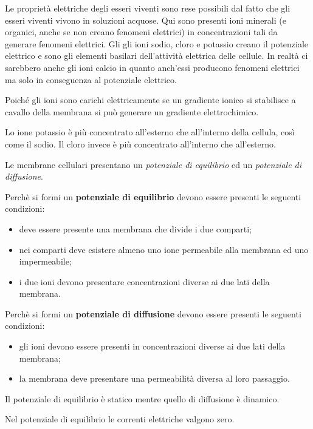 \documentclass[]{article}
\begin{document}
Le proprietà elettriche degli esseri viventi sono rese possibili dal
fatto che gli esseri viventi vivono in soluzioni acquose. Qui sono
presenti ioni minerali (e organici, anche se non creano fenomeni
elettrici) in concentrazioni tali da generare fenomeni elettrici. Gli
gli ioni sodio, cloro e potassio creano il potenziale elettrico e sono
gli elementi basilari dell'attività elettrica delle cellule. In realtà
ci sarebbero anche gli ioni calcio in quanto anch'essi producono
fenomeni elettrici ma solo in conseguenza al potenziale elettrico.

Poiché gli ioni sono carichi elettricamente se un gradiente ionico si
stabilisce a cavallo della membrana si può generare un gradiente
elettrochimico.

Lo ione potassio è più concentrato all'esterno che all'interno della
cellula, così come il sodio. Il cloro invece è più concentrato
all'interno che all'esterno.

Le membrane cellulari presentano un \emph{potenziale di equilibrio} ed
un \emph{potenziale di diffusione}.

Perchè si formi un \textbf{potenziale di equilibrio} devono essere
presenti le seguenti condizioni:

\begin{itemize}
\itemsep1pt\parskip0pt
\item
  deve essere presente una membrana che divide i due comparti;
\item
  nei comparti deve esistere almeno uno ione permeabile alla membrana ed
  uno impermeabile;
\item
  i due ioni devono presentare concentrazioni diverse ai due lati della
  membrana.
\end{itemize}

Perchè si formi un \textbf{potenziale di diffusione} devono essere
presenti le seguenti condizioni:

\begin{itemize}
\itemsep1pt\parskip0pt
\item
  gli ioni devono essere presenti in concentrazioni diverse ai due lati
  della membrana;
\item
  la membrana deve presentare una permeabilità diversa al loro
  passaggio.
\end{itemize}

Il potenziale di equilibrio è statico mentre quello di diffusione è
dinamico.

Nel potenziale di equilibrio le correnti elettriche valgono zero.
\end{document}
